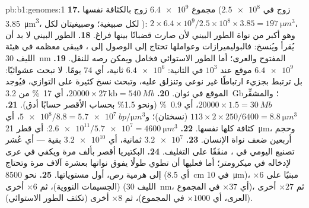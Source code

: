 \begin{solution}{pb:b1:genomes:1}
\textbf{17.} مجموع  $\num{6.4e9}$ زوج بالكثافة نفسها
($\num{2.5e8}$ زوج في \qty{3.85}{\micro m^3}، لكل صبيغية؛ وصبيغيتان
لكل ): $2\times 6.4\times 10^9/2.5\times 10^8\times
3.85 = \qty{197}{\micro m^3}$، وهو أكبر من نواة الطور البيني لأن
 صارت قضبانًا بينها فراغ.
\textbf{18.}  الطور البيني لا بد أن يُقرأ ويُنسخ: فالبوليميرازات
وعواملها تحتاج إلى الوصول إلى ، فيبقى معظمه في هيئة الليف
\qty{30}{nm} المفتوح والعرى؛ أما  الطور الاستوائي فخامل ويمكن
رصه للنقل.
\textbf{19.} $\num{6.4e9}$ موقع عند $10^3$ في الثانية:
$\num{6.4e6}$ ثانية، أي 74 يومًا.  لا تبحث عشوائيًا: بل
ترتبط بجزيء  ارتباطًا غير نوعي وتنزلق عليه، وتبحث نسخ كثيرة على
التوازي، فيُوجد الموقع في ثوان.
\textbf{20.} $\num{20000}\times 27\,\mathrm{kb} = \qty{540}{Mb}$، أي
\qty{17}{\%} من \qty{3.2}{Gb}؛ والمشفِّر $\num{20000}\times 1.5 =
\qty{30}{Mb}$، أي \qty{0.9}{\%} (ونحو 1.5\% بحساب  الأقصر
حسابًا أدق).
\textbf{21.} $113\times 2\times 250/6400 = \qty{8.8}{\micro m^3}$
(نسختان)؛ و$\num{5e8}/8.8 = \qty{5.7e7}{bp/\micro m^3}$، أي كثافة
 كلها نفسها.
\textbf{22.} $\num{2.6e11}/\num{5.7e7} = \qty{4600}{\micro m^3}$:
أي قطر \qty{21}{\micro m}، وحجم أربعين ضعف نواة الإنسان.
\textbf{23.} $\num{3.2e7}$ ثمانية، أي $\num{3.2e10}$ بقية --- أي عُشر
تصنيع  اليومي في ، منفَقًا على التغليف.
\textbf{24.}  البكتيريا أقصر بألف مرة ويكفي  في
عرى لإدخاله في ميكرومتر؛ أما  فعليها أن تطوي طولًا يفوق
نواتها بعشرة آلاف مرة وتحتاج إلى هرمية رص،  أول مستوياتها.
\textbf{25.} نحو \num{8500} (أي \qty{8.5}{cm} في \qty{10}{\micro m})،
مبنيًا على $\times 6$ (الجسيمات النووية)، ثم $\times 6$ أخرى (الليف
\qty{30}{nm}، أي $\times 37$ في المجموع)، ثم $\times 27$ أخرى (العرى،
أي $\times 1000$ في المجموع)، ثم $\times 8$ أخرى (تكثف الطور
الاستوائي).
\end{solution}
